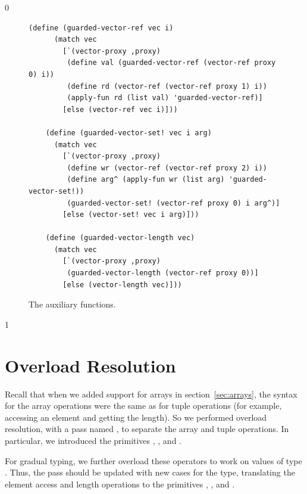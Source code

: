 \documentclass[7x10]{TimesAPriori_MIT}%
\def\racketEd{0}
\def\pythonEd{1}
\providecommand{\BookEdition}{1}
\let\edition\BookEdition
\newcommand{\pythonColor}[0]{}
\numberwithin{theorem}{chapter}
\numberwithin{definition}{chapter}
\numberwithin{equation}{chapter}
\begin{document}
{\if\edition\racketEd    
\begin{figure}[tbp]
\begin{tcolorbox}[colback=white]  
\begin{lstlisting}[basicstyle=\ttfamily\footnotesize]
    (define (guarded-vector-ref vec i)
      (match vec
        [`(vector-proxy ,proxy)
         (define val (guarded-vector-ref (vector-ref proxy 0) i))
         (define rd (vector-ref (vector-ref proxy 1) i))
         (apply-fun rd (list val) 'guarded-vector-ref)]
        [else (vector-ref vec i)]))
        
    (define (guarded-vector-set! vec i arg)
      (match vec
        [`(vector-proxy ,proxy)
         (define wr (vector-ref (vector-ref proxy 2) i))
         (define arg^ (apply-fun wr (list arg) 'guarded-vector-set!))
         (guarded-vector-set! (vector-ref proxy 0) i arg^)]
        [else (vector-set! vec i arg)]))
        
    (define (guarded-vector-length vec)
      (match vec
        [`(vector-proxy ,proxy)
         (guarded-vector-length (vector-ref proxy 0))]
        [else (vector-length vec)]))
\end{lstlisting}
\end{tcolorbox}

\caption{The  auxiliary functions.}
  \label{fig:guarded-tuple}
\end{figure}
\fi}

{\if\edition\pythonEd\pythonColor
\section{Overload Resolution }
\label{sec:gradual-resolution}

Recall that when we added support for arrays in
section~\ref{sec:arrays}, the syntax for the array operations were the
same as for tuple operations (for example, accessing an element and
getting the length). So we performed overload resolution, with a pass
named , to separate the array and tuple operations.  In
particular, we introduced the primitives ,
, and .

For gradual typing, we further overload these operators to work on
values of type \CANYTY{}. Thus, the  pass should be
updated with new cases for the \CANYTY{} type, translating the element
access and length operations to the primitives ,
, and .

\fi}
\end{document}
